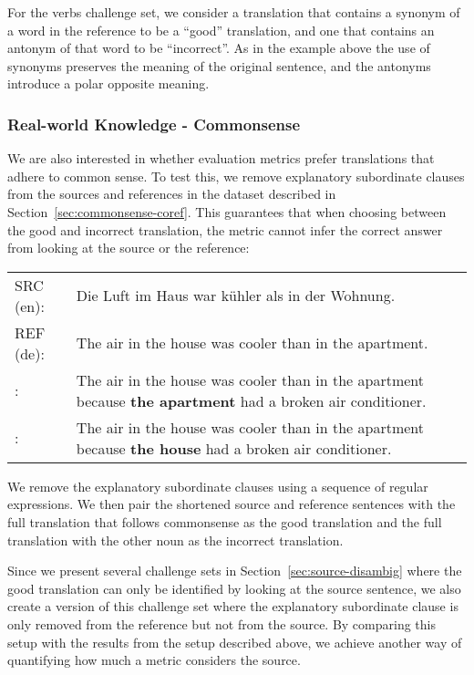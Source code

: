 \documentclass[11pt]{article}
\newcommand{\cmark}{\textcolor{darkpastelgreen}{\ding{51}}}\newcommand{\xmark}{\textcolor{darkpastelred}{\ding{55}}}
\begin{document}
For the verbs challenge set, we consider a translation that contains a synonym of a word in the reference to be a ``good'' translation, and one that contains an antonym of that word to be ``incorrect''. As in the example above the use of synonyms preserves the meaning of the original sentence, and the antonyms introduce a polar opposite meaning.



\subsubsection{Real-world Knowledge - Commonsense}
\label{subsec:real-world-commonsense}

We are also interested in whether evaluation metrics prefer translations that adhere to common sense. To test this, we remove explanatory subordinate clauses from the sources and references in the dataset described in Section~\ref{sec:commonsense-coref}. This guarantees that when choosing between the good and incorrect translation, the metric cannot infer the correct answer from looking at the source or the reference:

\begin{small}
\vspace{0.5cm}
\setlength{\extrarowheight}{0.1cm}
\begin{tabularx}{0.95\columnwidth}{lX}
     SRC (en): & Die Luft im Haus war kühler als in der Wohnung. \\
     REF (de): & The air in the house was cooler than in the apartment. \\
     \cmark: & The air in the house was cooler than in the apartment because \textbf{the apartment} had a broken air conditioner. \\
     \xmark: & The air in the house was cooler than in the apartment because \textbf{the house} had a broken air conditioner. \vspace{0.35cm}
\end{tabularx}
\end{small}

We remove the explanatory subordinate clauses using a sequence of regular expressions. We then pair the shortened source and reference sentences with the full translation that follows commonsense as the good translation and the full translation with the other noun as the incorrect translation. 

Since we present several challenge sets in Section~\ref{sec:source-disambig} where the good translation can only be identified by looking at the source sentence, we also create a version of this challenge set where the explanatory subordinate clause is only removed from the reference but not from the source. By comparing this setup with the results from the setup described above, we achieve another way of quantifying how much a metric considers the source.
\end{document}
